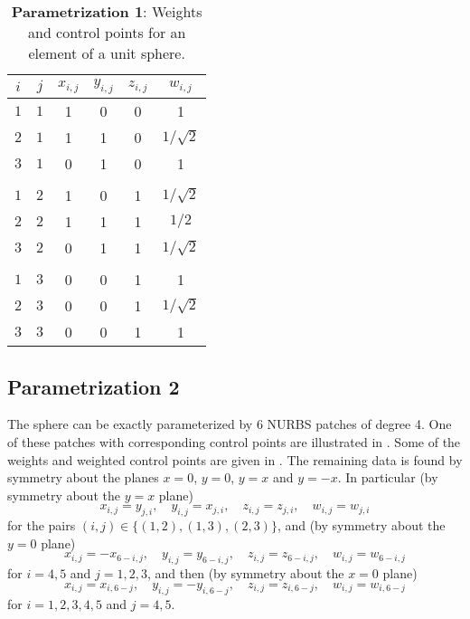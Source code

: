 \begin{table}
	\centering
	\caption{\textbf{Parametrization 1}: Weights and control points for an element of a unit sphere.}
	\label{Tab3:sphere1}
	\begin{tabular}{c c c c c c}
		\toprule
		$i$		& 	$j$	& 	$x_{i,j}$ 	& $y_{i,j}$ 	& $z_{i,j}$ 	& $w_{i,j}$\\
		\hline
		$1$		&	$1$	&	1	& 0		& 0		&	1				\\
		$2$		&	$1$	&	1	& 1		& 0 	&	$1/\sqrt{2}$	\\
		$3$		&	$1$	&	0	& 1		& 0		&	1				\\ \\
		
		$1$		&	$2$	&	1	& 0		& 1		&	$1/\sqrt{2}$				\\
		$2$		&	$2$	&	1	& 1		& 1 	&	$1/2$	\\
		$3$		&	$2$	&	0	& 1		& 1		&	$1/\sqrt{2}$				\\ \\
		
		$1$		&	$3$	&	0	& 0		& 1		&	1				\\
		$2$		&	$3$	&	0	& 0		& 1 	&	$1/\sqrt{2}$	\\
		$3$		&	$3$	&	0	& 0		& 1		&	1				\\
		\bottomrule
	\end{tabular}
\end{table}

\subsection{Parametrization 2}
\label{Sec3:NURBSsphere2}
The sphere can be exactly parameterized \cite[p. 11]{Cobb1988tts} by 6 NURBS patches of degree 4. One of these patches with corresponding control points are illustrated in . Some of the weights and weighted control points are given in . The remaining data is found by symmetry about the planes $x=0$, $y=0$, $y=x$ and $y=-x$. In particular (by symmetry about the $y=x$ plane)
\begin{equation*}
	x_{i,j} = y_{j,i},\quad y_{i,j} = x_{j,i},\quad z_{i,j} = z_{j,i},\quad w_{i,j} = w_{j,i}
\end{equation*}
for the pairs $(i,j) \in\{(1,2),(1,3),(2,3)\}$, and (by symmetry about the $y=0$ plane)
\begin{equation*}
	x_{i,j} = -x_{6-i,j},\quad y_{i,j} = y_{6-i,j},\quad z_{i,j} = z_{6-i,j},\quad w_{i,j} = w_{6-i,j}
\end{equation*}
for $i=4,5$ and $j=1,2,3$, and then (by symmetry about the $x=0$ plane)
\begin{equation*}
	x_{i,j} = x_{i,6-j},\quad y_{i,j} = -y_{i,6-j},\quad z_{i,j} = z_{i,6-j},\quad w_{i,j} = w_{i,6-j}
\end{equation*}
for $i=1,2,3,4,5$ and $j=4,5$.

